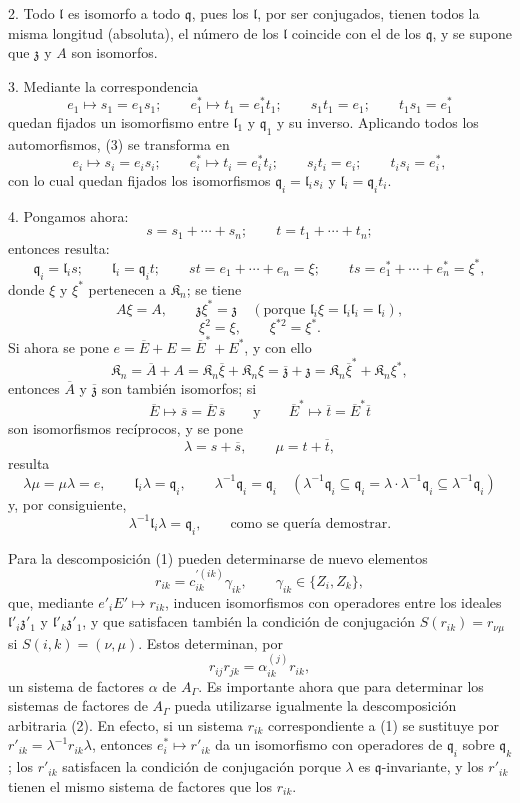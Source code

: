 2. Todo \(\mathfrak l\) es isomorfo a todo \(\mathfrak q\), pues los \(\mathfrak l\), por ser conjugados, tienen todos la misma longitud (absoluta), el número de los \(\mathfrak l\) coincide con el de los \(\mathfrak q\), y se supone que \(\mathfrak z\) y \(A\) son isomorfos.

3. Mediante la correspondencia
\[
\tag{3}
e_1\mapsto s_1=e_1s_1;\qquad
e_1^*\mapsto t_1=e_1^*t_1;\qquad
s_1t_1=e_1;\qquad
t_1s_1=e_1^*
\]
quedan fijados un isomorfismo entre \(\mathfrak l_1\) y \(\mathfrak q_1\) y su inverso. Aplicando todos los automorfismos, (3) se transforma en
\[
e_i\mapsto s_i=e_is_i;\qquad
e_i^*\mapsto t_i=e_i^*t_i;\qquad
s_it_i=e_i;\qquad
t_is_i=e_i^*,
\]
con lo cual quedan fijados los isomorfismos \(\mathfrak q_i=\mathfrak l_is_i\) y \(\mathfrak l_i=\mathfrak q_it_i\).

4. Pongamos ahora:
\[
s=s_1+\cdots+s_n;\qquad t=t_1+\cdots+t_n;
\]
entonces resulta:
\[
\mathfrak q_i=\mathfrak l_is;\qquad
\mathfrak l_i=\mathfrak q_it;\qquad
st=e_1+\cdots+e_n=\xi;\qquad
ts=e_1^*+\cdots+e_n^*=\xi^*,
\]
donde \(\xi\) y \(\xi^*\) pertenecen a \(\mathfrak K_n\); se tiene
\[
A\xi=A,\qquad \mathfrak z\xi^*=\mathfrak z\quad
(\text{porque }\mathfrak l_i\xi=\mathfrak l_i\mathfrak l_i=\mathfrak l_i),
\]
\[
\xi^2=\xi,\qquad \xi^{*2}=\xi^*.
\]
Si ahora se pone \(e=\overline E+E=\overline E^*+E^*\), y con ello
\[
\mathfrak K_n=\overline A+A
=\mathfrak K_n\overline\xi+\mathfrak K_n\xi
=\overline{\mathfrak z}+\mathfrak z
=\mathfrak K_n\overline\xi^*+\mathfrak K_n\xi^*,
\]
entonces \(\overline A\) y \(\overline{\mathfrak z}\) son también isomorfos; si
\[
\overline E\mapsto\overline s=\overline E\,\overline s
\qquad\text{y}\qquad
\overline E^*\mapsto\overline t=\overline E^*\overline t
\]
son isomorfismos recíprocos, y se pone
\[
\lambda=s+\overline s,\qquad \mu=t+\overline t,
\]
resulta
\[
\lambda\mu=\mu\lambda=e,\qquad
\mathfrak l_i\lambda=\mathfrak q_i,\qquad
\lambda^{-1}\mathfrak q_i=\mathfrak q_i
\quad
(\lambda^{-1}\mathfrak q_i\subseteq\mathfrak q_i
=\lambda\cdot\lambda^{-1}\mathfrak q_i\subseteq\lambda^{-1}\mathfrak q_i)
\]
y, por consiguiente,
\[
\lambda^{-1}\mathfrak l_i\lambda=\mathfrak q_i,\qquad \text{como se quería demostrar.}
\]

Para la descomposición (1) pueden determinarse de nuevo elementos
\[
r_{ik}=c_{ik}^{\prime(ik)}\gamma_{ik},\qquad \gamma_{ik}\in\{Z_i,Z_k\},
\]
que, mediante \(e'_iE'\mapsto r_{ik}\), inducen isomorfismos con operadores entre los ideales \(\mathfrak l'_i\mathfrak z'_1\) y \(\mathfrak l'_k\mathfrak z'_1\), y que satisfacen también la condición de conjugación \(S(r_{ik})=r_{\nu\mu}\) si \(S(i,k)=(\nu,\mu)\). Estos determinan, por
\[
r_{ij}r_{jk}=\alpha_{ik}^{(j)}r_{ik},
\]
un sistema de factores \(\alpha\) de \(A_\Gamma\). Es importante ahora que para determinar los sistemas de factores de \(A_\Gamma\) pueda utilizarse igualmente la descomposición arbitraria (2). En efecto, si un sistema \(r_{ik}\) correspondiente a (1) se sustituye por \(r'_{ik}=\lambda^{-1}r_{ik}\lambda\), entonces \(e_i^*\mapsto r'_{ik}\) da un isomorfismo con operadores de \(\mathfrak q_i\) sobre \(\mathfrak q_k\); los \(r'_{ik}\) satisfacen la condición de conjugación porque \(\lambda\) es \(\mathfrak q\)-invariante, y los \(r'_{ik}\) tienen el mismo sistema de factores que los \(r_{ik}\).

